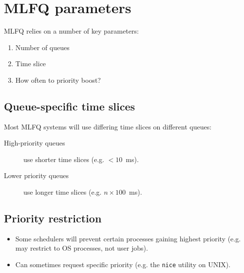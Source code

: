 \section{MLFQ parameters}

MLFQ relies on a number of key parameters:

\begin{enumerate}
\item Number of queues
\item Time slice
\item How often to priority boost?
\end{enumerate}

\subsection{Queue-specific time slices}

Most MLFQ systems will use differing time slices on different queues:
\begin{description}
\item[High-priority queues] use shorter time slices (e.g. $<10$~ms).
\item[Lower priority queues] use longer time slices (e.g. $n\times100$~ms).
\end{description}

\subsection{Priority restriction}

\begin{itemize}
\item Some schedulers will prevent certain processes gaining highest priority (e.g. may restrict to OS processes, not user jobs).
\item Can sometimes request specific priority (e.g. the \texttt{nice} utility on UNIX).
\end{itemize}


